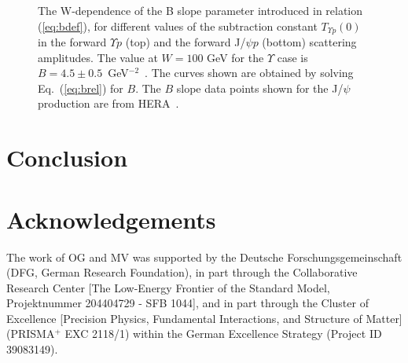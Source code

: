 \documentclass[10pt,prd,aps,nofootinbib,superscriptaddress]{revtex4}
\begin{document}
\begin{figure}
\caption{
The W-dependence of the B slope parameter introduced in relation (\ref{eq:bdef}),
for different values of the subtraction constant $T_{\Upsilon p} (0)$ in the forward $\Upsilon p$ (top)
and the forward J/$\psi p $ (bottom) scattering amplitudes.
The value at $W=100$ GeV for the $\Upsilon$ case is $B=4.5\pm0.5$~GeV$^{-2}$~\cite{Chekanov:2009zz}.
The curves shown are obtained by solving Eq.~(\ref{eq:brel}) for $B$.
The $B$ slope data points shown for the J/$\psi$ production are from HERA~\cite{Chekanov:2002xi}.
}
\label{fig:bslope}
\end{figure}

\section{Conclusion}

\section*{Acknowledgements}
The work of OG and MV was supported by the Deutsche Forschungsgemeinschaft (DFG, German Research Foundation),
in part through the Collaborative Research Center [The Low-Energy Frontier of the Standard
Model, Projektnummer 204404729 - SFB 1044], and in part through the Cluster of Excellence
[Precision Physics, Fundamental Interactions, and Structure of Matter] (PRISMA$^+$ EXC
2118/1) within the German Excellence Strategy (Project ID 39083149).
\end{document}
